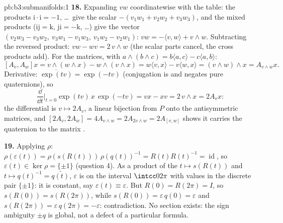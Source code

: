 \begin{solution}{pb:b3:submanifolds:1}
\textbf{18.} Expanding $vw$ coordinatewise with the table:
the products $\mathrm i\cdot\mathrm i = -1$, \dots\ give
the scalar $-(v_1w_1 + v_2w_2 + v_3w_3)$, and the mixed
products ($\mathrm{ij} = \mathrm k$, $\mathrm{ji} =
-\mathrm k$, \dots) give the vector $(v_2w_3 - v_3w_2,\
v_3w_1 - v_1w_3,\ v_1w_2 - v_2w_1)$: $vw = -\langle v,
w\rangle + v\wedge w$. Subtracting the reversed product:
$vw - wv = 2\,v\wedge w$ (the scalar parts cancel, the
cross products add). For the matrices, with $a\wedge(b\wedge
c) = b\langle a, c\rangle - c\langle a, b\rangle$:
\[
[A_v, A_w]x = v\wedge(w\wedge x) - w\wedge(v\wedge x)
= w\langle v, x\rangle - v\langle w, x\rangle
= (v\wedge w)\wedge x = A_{v\wedge w}x .
\]
Derivative: $\overline{\exp(tv)} = \exp(-tv)$ (conjugation
is  and negates pure quaternions), so
\[
\frac{\dd}{\dd t}\Bigr|_{t=0}\exp(tv)\,x\,\exp(-tv) = vx -
xv = 2\,v\wedge x = 2A_vx :
\]
the differential is $v \mapsto 2A_v$, a linear bijection
from $P$ onto the antisymmetric matrices, and $[2A_v, 2A_w]
= 4A_{v\wedge w} = 2A_{2v\wedge w} = 2A_{[v,w]}$ shows it
carries the quaternion  to the matrix
\omterm{def:b3:groups:derived}{commutator}.

\textbf{19.} Applying $\rho$: $\rho(\varepsilon(t)) =
\rho(s(R(t)))\,\rho(q(t))^{-1} = R(t)R(t)^{-1} =
\operatorname{id}$, so $\varepsilon(t) \in \ker\rho =
\{\pm1\}$ (question 4). As a product of the 
$t \mapsto s(R(t))$ and $t \mapsto q(t)^{-1} =
\bar{q(t)}$, $\varepsilon$ is  on the 
interval $\intcc0{2\pi}$ with values in the discrete pair
$\{\pm1\}$: it is constant, say $\varepsilon(t) \equiv
\varepsilon$. But $R(0) = R(2\pi) = I$, so $s(R(0)) =
s(R(2\pi))$, while $s(R(0)) = \varepsilon\,q(0) =
\varepsilon$ and $s(R(2\pi)) = \varepsilon\,q(2\pi) =
-\varepsilon$: contradiction. No  section
exists: the sign ambiguity $\pm q$ is global, not a defect
of a particular formula.


\end{solution}
